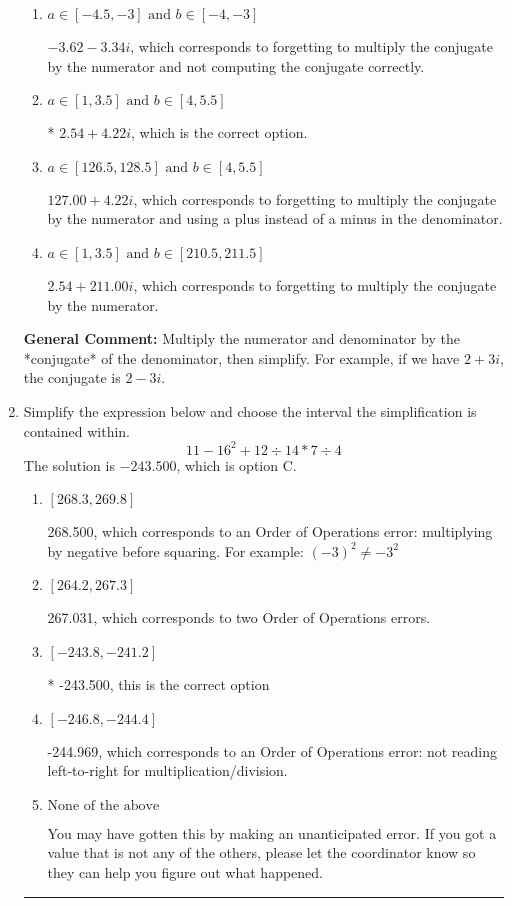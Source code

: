 \documentclass{extbook}[14pt]
\newcommand{\litem}[1]{\item #1

\rule{\textwidth}{0.4pt}}
\begin{document}
\begin{enumerate}
{\begin{enumerate}[label=\Alph*.]
 $-27.00  + 3.14 i$, which corresponds to just dividing the first term by the first term and the second by the second.
\item \( a \in [-4.5, -3] \text{ and } b \in [-4, -3] \)

 $-3.62  - 3.34 i$, which corresponds to forgetting to multiply the conjugate by the numerator and not computing the conjugate correctly.
\item \( a \in [1, 3.5] \text{ and } b \in [4, 5.5] \)

* $2.54  + 4.22 i$, which is the correct option.
\item \( a \in [126.5, 128.5] \text{ and } b \in [4, 5.5] \)

 $127.00  + 4.22 i$, which corresponds to forgetting to multiply the conjugate by the numerator and using a plus instead of a minus in the denominator.
\item \( a \in [1, 3.5] \text{ and } b \in [210.5, 211.5] \)

 $2.54  + 211.00 i$, which corresponds to forgetting to multiply the conjugate by the numerator.
\end{enumerate}

\textbf{General Comment:} Multiply the numerator and denominator by the *conjugate* of the denominator, then simplify. For example, if we have $2+3i$, the conjugate is $2-3i$.
}
\litem{
Simplify the expression below and choose the interval the simplification is contained within.
\[ 11 - 16^2 + 12 \div 14 * 7 \div 4 \]The solution is \( -243.500 \), which is option C.\begin{enumerate}[label=\Alph*.]
\item \( [268.3, 269.8] \)

 268.500, which corresponds to an Order of Operations error: multiplying by negative before squaring. For example: $(-3)^2 \neq -3^2$
\item \( [264.2, 267.3] \)

 267.031, which corresponds to two Order of Operations errors.
\item \( [-243.8, -241.2] \)

* -243.500, this is the correct option
\item \( [-246.8, -244.4] \)

 -244.969, which corresponds to an Order of Operations error: not reading left-to-right for multiplication/division.
\item \( \text{None of the above} \)

 You may have gotten this by making an unanticipated error. If you got a value that is not any of the others, please let the coordinator know so they can help you figure out what happened.
\end{enumerate}

}
\end{enumerate}
\end{document}
